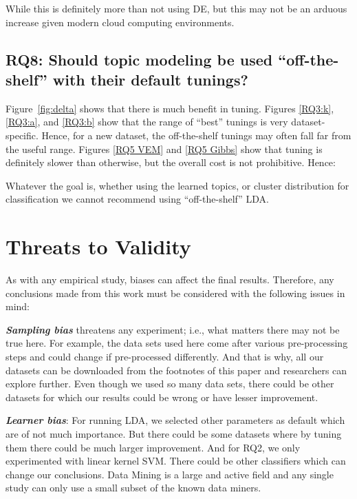 \documentclass[twocolumn,5p,sort&compress]{elsarticle}
\theoremstyle{break}
\begin{document}
  While this is definitely more than not using DE, but this may not be an arduous increase
  given modern cloud computing environments.
  

\subsection{\textbf{RQ8: Should topic modeling be used ``off-the-shelf'' with their default tunings?}}

  Figure~\ref{fig:delta} shows that there is much benefit in tuning.
  Figures \ref{RQ3:k}, \ref{RQ3:a}, and \ref{RQ3:b} show that
  the range of ``best'' tunings is very dataset-specific. Hence, for a new dataset,
  the off-the-shelf tunings
  may often fall far from the useful range.
  Figures \ref{RQ5 VEM} and \ref{RQ5 Gibbs} show that tuning is definitely
  slower than otherwise, but the overall cost is not prohibitive.
  Hence:
  \begin{lesson}
    Whatever the goal is, whether using the learned topics, or cluster distribution for classification
    we cannot recommend using ``off-the-shelf'' LDA.
  \end{lesson}


\section{Threats to Validity}
\label{sect:validity}

As with any empirical study, biases can affect the final
results. Therefore, any conclusions made from this work must be considered with the following issues in mind:

\textbf{\textit{Sampling bias}} threatens any experiment; i.e., what matters there may not be true here. For example,
the data sets used here come after various pre-processing steps and could change if pre-processed differently. And that is why, all our datasets can be downloaded from the footnotes of this paper and researchers can explore further. Even though we used so many data sets, there could be other datasets for which our results could be wrong or have lesser improvement.

\textbf{\textit{Learner bias}}: For running LDA, we selected other parameters as default which are of not much importance. But there could be some datasets where by tuning them there could be much larger improvement. And for RQ2, we only experimented with linear kernel SVM. There could be other classifiers which can change our conclusions. Data Mining is a large and active field and any single study can only use a small subset of the known data miners.
\end{document}
